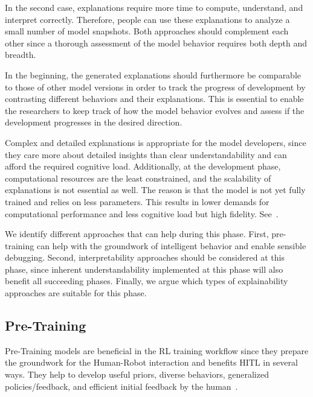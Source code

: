 \documentclass[twoside,11pt]{article}
\begin{document}
In the second case, explanations require more time to compute, understand, and interpret correctly. Therefore, people can use these explanations to analyze a small number of model snapshots.
Both approaches should complement each other since a thorough assessment of the model behavior requires both depth and breadth.

In the beginning, the generated explanations should furthermore be comparable to those of other model versions in order to track the progress of development by contrasting different behaviors and their explanations. This is essential to enable the researchers to keep track of how the model behavior evolves and assess if the development progresses in the desired direction.

Complex and detailed explanations is appropriate for the model developers, since they care more about detailed insights than clear understandability and can afford the required cognitive load. Additionally, at the development phase, computational resources are the least constrained, and the scalability of explanations is not essential as well. The reason is that the model is not yet fully trained and relies on less parameters. This results in lower demands for computational performance and less cognitive load but high fidelity. See~\citet{milani2022survey}.

We identify different approaches that can help during this phase. First, pre-training can help with the groundwork of intelligent behavior and enable sensible debugging. Second, interpretability approaches should be considered at this phase, since inherent understandability implemented at this phase will also benefit all succeeding phases. Finally, we argue which types of explainability approaches are suitable for this phase.

\subsection{Pre-Training}

Pre-Training models are beneficial in the RL training workflow since they prepare the groundwork for the Human-Robot interaction and benefits HITL in several ways. They help to 
develop useful priors, diverse behaviors, generalized policies/feedback, and efficient initial feedback by the human~\citep{daniel2016hierarchical,eysenbach2018diversity,florensa2017stochastic,hazan2019provably,LeeSmithAbbeel:2021:FeedbackPreferenceHITLLearningPEBBLE}.
\end{document}
